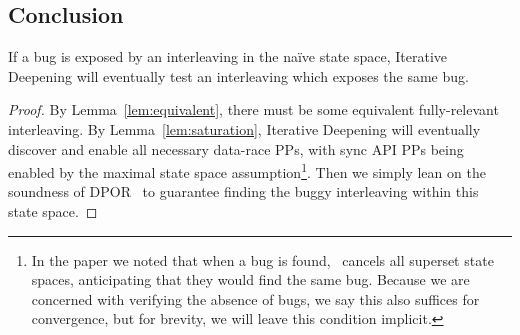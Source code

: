 
\subsection{Conclusion}

\setcounter{theorem}{1}
\begin{theorem}
	If a bug is exposed by an interleaving in the na\"{i}ve state space, Iterative Deepening will eventually test an interleaving which exposes the same bug.
\end{theorem}

\begin{proof}
By Lemma~\ref{lem:equivalent}, there must be some equivalent fully-relevant interleaving.
By Lemma~\ref{lem:saturation}, Iterative Deepening will eventually discover and enable all necessary data-race PPs, with sync API PPs being enabled by the maximal state space assumption\footnote{
		In the paper we noted that when a bug is found, \quicksand~cancels all superset state spaces, anticipating that they would find the same bug.
		Because we are concerned with verifying the absence of bugs, we say this also suffices for convergence, but for brevity, we will leave this condition implicit.}.
Then we simply lean on the soundness of DPOR~\cite{dpor} to guarantee finding the buggy interleaving within this state space.
\end{proof}
